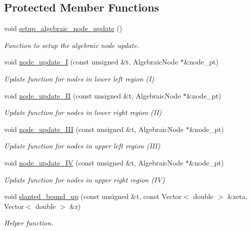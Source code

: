 \subsection*{Protected Member Functions}
\begin{DoxyCompactItemize}
\item 
void \hyperlink{classoomph_1_1AlgebraicChannelWithLeafletMesh_a0d6cb8a8ffa830cdd73aa0f6686f150f}{setup\+\_\+algebraic\+\_\+node\+\_\+update} ()
\begin{DoxyCompactList}\small\item\em Function to setup the algebraic node update. \end{DoxyCompactList}\item 
void \hyperlink{classoomph_1_1AlgebraicChannelWithLeafletMesh_a53de0d31556bc78e22b5c06bb66bdd73}{node\+\_\+update\+\_\+I} (const unsigned \&t, Algebraic\+Node $\ast$\&node\+\_\+pt)
\begin{DoxyCompactList}\small\item\em Update function for nodes in lower left region (I) \end{DoxyCompactList}\item 
void \hyperlink{classoomph_1_1AlgebraicChannelWithLeafletMesh_aafaeee96d0e7602cc990229abbd9c8fd}{node\+\_\+update\+\_\+\+II} (const unsigned \&t, Algebraic\+Node $\ast$\&node\+\_\+pt)
\begin{DoxyCompactList}\small\item\em Update function for nodes in lower right region (II) \end{DoxyCompactList}\item 
void \hyperlink{classoomph_1_1AlgebraicChannelWithLeafletMesh_a5aed6f41b197dc7aab1d5d86b1b7d6d5}{node\+\_\+update\+\_\+\+I\+II} (const unsigned \&t, Algebraic\+Node $\ast$\&node\+\_\+pt)
\begin{DoxyCompactList}\small\item\em Update function for nodes in upper left region (I\+II) \end{DoxyCompactList}\item 
void \hyperlink{classoomph_1_1AlgebraicChannelWithLeafletMesh_ac960faed226fa81f52ca605cffe3d1af}{node\+\_\+update\+\_\+\+IV} (const unsigned \&t, Algebraic\+Node $\ast$\&node\+\_\+pt)
\begin{DoxyCompactList}\small\item\em Update function for nodes in upper right region (IV) \end{DoxyCompactList}\item 
void \hyperlink{classoomph_1_1AlgebraicChannelWithLeafletMesh_ab3659949ea5faac4ffa981828e98cf53}{slanted\+\_\+bound\+\_\+up} (const unsigned \&t, const Vector$<$ double $>$ \&zeta, Vector$<$ double $>$ \&r)
\begin{DoxyCompactList}\small\item\em Helper function. \end{DoxyCompactList}\end{DoxyCompactItemize}
